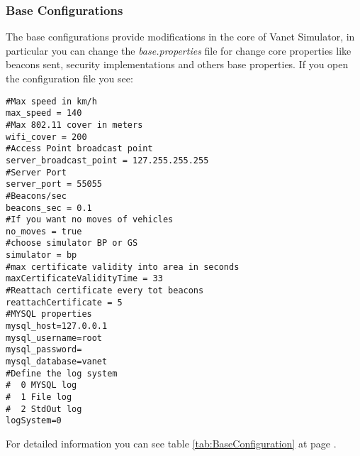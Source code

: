 \subsubsection{Base Configurations}\label{usermanual:baseconfiguration}
The base configurations provide modifications in the core of Vanet Simulator, in particular you can change the \textit{base.properties} file for change core properties like beacons sent, security implementations and others base properties.
If you open the configuration file you see:
\begin{verbatim}
#Max speed in km/h
max_speed = 140
#Max 802.11 cover in meters
wifi_cover = 200
#Access Point broadcast point
server_broadcast_point = 127.255.255.255
#Server Port
server_port = 55055
#Beacons/sec
beacons_sec = 0.1
#If you want no moves of vehicles
no_moves = true
#choose simulator BP or GS
simulator = bp
#max certificate validity into area in seconds
maxCertificateValidityTime = 33
#Reattach certificate every tot beacons
reattachCertificate = 5
#MYSQL properties
mysql_host=127.0.0.1
mysql_username=root
mysql_password=
mysql_database=vanet
#Define the log system
#  0 MYSQL log
#  1 File log
#  2 StdOut log
logSystem=0
\end{verbatim}
For detailed information you can see table \ref{tab:BaseConfiguration} at page \pageref{tab:BaseConfiguration}.
